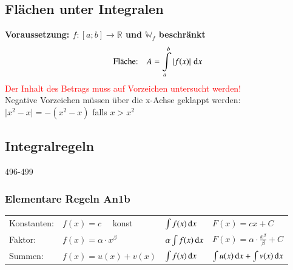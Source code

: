 \subsection{Flächen unter Integralen}

\textbf{Voraussetzung: $f: [a;b] \to \mathbb{R}$ und $\mathbb{W}_f$ beschränkt}
$$ \text{Fläche:} \quad A = \int \limits_{a}^{b} \left| f(x) \right| \, \mathop{} \! \mathrm{d} x $$
\textcolor{red}{Der Inhalt des Betrags muss auf Vorzeichen untersucht werden!} \\
Negative Vorzeichen müssen über die x-Achse geklappt werden: \\
$\vert x^2 - x \vert = -(x^2 - x)$ falls $x > x^2$ 


\subsection{Integralregeln}{496-499}

\subsubsection{Elementare Regeln An1b}

\vspace{-0.2cm}
\renewcommand{\arraystretch}{1.6}
\begin{tabular}{llll}
    Konstanten:     & $f(x) = c \quad$ konst                & $\int f(x) \mathop{} \! \mathrm{d} x$                      & $F(x) = cx + C$\\
    Faktor:         & $f(x) = \alpha \cdot x^\beta$             & $\alpha \int f(x) \mathop{} \! \mathrm{d} x$           & $F(x) = \alpha \cdot \frac{x^\beta}{\beta} + C$ \\
    Summen:         & $f(x) = u(x) + v(x) $                 & $\int f(x) \mathop{} \! \mathrm{d} x$                      & $\int u(x) \mathop{} \! \mathrm{d} x + \int v(x) \mathop{} \! \mathrm{d} x$    
\end{tabular}


